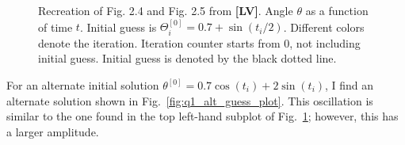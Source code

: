 \documentclass[12pt]{article}
\begin{document}
\begin{figure}[!h]
	\caption{
		Recreation of Fig. 2.4 and Fig. 2.5 from \textbf{[LV]}.
		Angle $\theta$ as a function of time $t$. 
		Initial guess is $\Theta_{i}^{[0]} = 0.7+\sin(t_{i}/2)$.
		Different colors denote the iteration. Iteration counter starts from 0, not including initial guess. Initial guess is denoted by the black dotted line.
	}
	\label{fig:2pt4_2pt5_recreation}
\end{figure}

\FloatBarrier

For an alternate initial solution $\theta^{[0]}=0.7\cos(t_{i})+2\sin(t_{i})$, I find an alternate solution shown in Fig.~\ref{fig:q1_alt_guess_plot}. This oscillation is similar to the one found in the top left-hand subplot of Fig.~\ref{fig:2pt4_2pt5_recreation}; however, this has a larger amplitude.
\end{document}
